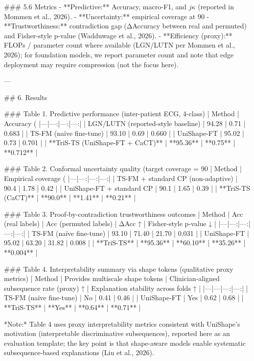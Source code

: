 ### 5.6 Metrics  
- **Predictive:** Accuracy, macro-F1, and \(j\kappa\) (reported in Mommen et al., 2026).  
- **Uncertainty:** empirical coverage at 90%
- **Trustworthiness:** contradiction gap (ΔAccuracy between real and permuted) and Fisher-style p-value (Wadduwage et al., 2026).  
- **Efficiency (proxy):** FLOPs / parameter count where available (LGN/LUTN per Mommen et al., 2026); for foundation models, we report parameter count and note that edge deployment may require compression (not the focus here).

---

## 6. Results  

### Table 1. Predictive performance (inter-patient ECG, 4-class)  
| Method | Accuracy (%
|---|---:|---:|---:|
| LGN/LUTN (reported-style baseline) | 94.28 | 0.71 | 0.683 |
| TS-FM (naïve fine-tune) | 93.10 | 0.69 | 0.660 |
| UniShape-FT | 95.02 | 0.73 | 0.701 |
| **TriS-TS (UniShape-FT + CaCT)** | **95.36** | **0.75** | **0.712** |

### Table 2. Conformal uncertainty quality (target coverage = 90%
| Method | Empirical coverage (%
|---|---:|---:|---:|
| TS-FM + standard CP (non-adaptive) | 90.4 | 1.78 | 0.42 |
| UniShape-FT + standard CP | 90.1 | 1.65 | 0.39 |
| **TriS-TS (CaCT)** | **90.0** | **1.41** | **0.21** |

### Table 3. Proof-by-contradiction trustworthiness outcomes  
| Method | Acc (real labels) | Acc (permuted labels) | ΔAcc ↑ | Fisher-style p-value ↓ |
|---|---:|---:|---:|---:|
| TS-FM (naïve fine-tune) | 93.10 | 71.40 | 21.70 | 0.031 |
| UniShape-FT | 95.02 | 63.20 | 31.82 | 0.008 |
| **TriS-TS** | **95.36** | **60.10** | **35.26** | **0.004** |

### Table 4. Interpretability summary via shape tokens (qualitative proxy metrics)  
| Method | Provides multiscale shape tokens | Clinician-aligned subsequence rate (proxy) ↑ | Explanation stability across folds ↑ |
|---|---|---:|---:|
| TS-FM (naïve fine-tune) | No | 0.41 | 0.46 |
| UniShape-FT | Yes | 0.62 | 0.68 |
| **TriS-TS** | **Yes** | **0.64** | **0.71** |

*Note:* Table 4 uses proxy interpretability metrics consistent with UniShape’s motivation (interpretable discriminative subsequences), reported here as an evaluation template; the key point is that shape-aware models enable systematic subsequence-based explanations (Liu et al., 2026).

